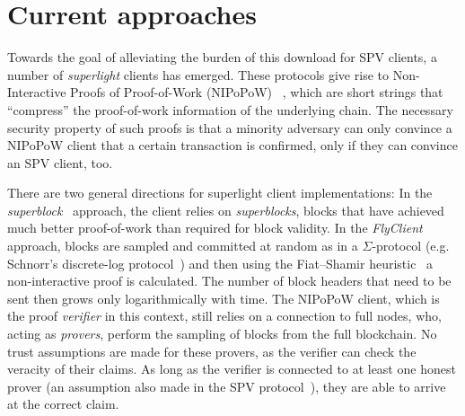 \section{Current approaches}
Towards the goal of alleviating the burden of this download for SPV clients, a
number of \emph{superlight} clients has emerged. 
These protocols give rise to  Non-Interactive Proofs of Proof-of-Work (NIPoPoW)
~\cite{nipopows}, which are short strings
 that ``compress'' the proof-of-work information of the underlying chain. 
The necessary security property of such proofs is that a
minority adversary can only convince a
NIPoPoW client that a certain transaction is confirmed, only if they can
convince an SPV client, too.

There are two general directions for superlight client implementations: In the
\emph{superblock}~\cite{nipopows,compactsuperblocks} approach, the client
relies on \emph{superblocks}, blocks that have achieved much better
proof-of-work than required for block validity. In the
\emph{FlyClient}~\cite{flyclient} approach, blocks are sampled and committed at random as in a $\Sigma$-protocol (e.g. Schnorr's discrete-log protocol~\cite{schnorr}) and then using 
the Fiat--Shamir heuristic~\cite{fiatshamir} a non-interactive proof is calculated. The number of block headers
that need to be sent then grows only logarithmically with time. The NIPoPoW
client, which is the proof \emph{verifier} in this context, still relies on a connection to full nodes,
who, acting as \emph{provers},  perform the sampling of blocks from the full
blockchain. 
No trust assumptions are made for these provers, as the
verifier can check the veracity of their claims. As long as the verifier is
connected to at least one honest prover (an assumption also made in the SPV
protocol~\cite{eclipse,eclipse-ethereum}), they are able to arrive at the correct claim.


